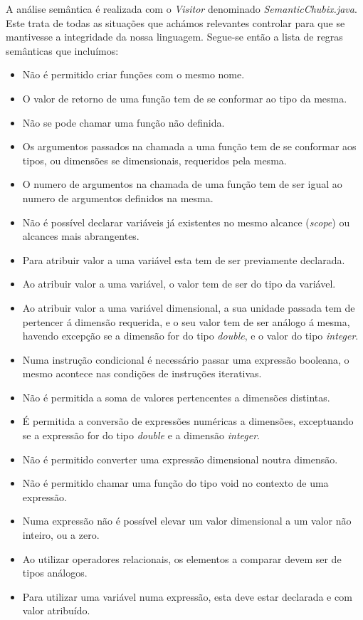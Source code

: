 \documentclass[10pt,portuguese]{article}
\begin{document}
\par A análise semântica é realizada com o \emph{Visitor} denominado \emph{SemanticChubix.java}. Este trata de todas as situações que achámos relevantes controlar para que se mantivesse a integridade da nossa linguagem. Segue-se então a lista de regras semânticas que incluímos:
\begin{itemize}
    \item Não é permitido criar funções com o mesmo nome.
    \item O valor de retorno de uma função tem de se conformar ao tipo da mesma.
    \item Não se pode chamar uma função não definida.
    \item Os argumentos passados na chamada a uma função tem de se conformar aos tipos, ou dimensões se dimensionais, requeridos pela mesma.
    \item O numero de argumentos na chamada de uma função tem de ser igual ao numero de argumentos definidos na mesma.
    \item Não é possível declarar variáveis já existentes no mesmo alcance (\emph{scope}) ou alcances mais abrangentes.
    \item Para atribuir valor a uma variável esta tem de ser previamente declarada.
    \item Ao atribuir valor a uma variável, o valor tem de ser do tipo da variável.
    \item Ao atribuir valor a uma variável dimensional, a sua unidade passada tem de pertencer á dimensão requerida, e o seu valor tem de ser análogo á mesma, havendo excepção se a dimensão for do tipo \emph{double}, e o valor do tipo \emph{integer}.
    \item Numa instrução condicional é necessário passar uma expressão booleana, o mesmo acontece nas condições de instruções iterativas.
    \item Não é permitida a soma de valores pertencentes a dimensões distintas.
    \item É permitida a conversão de expressões numéricas a dimensões, exceptuando se a expressão for do tipo \emph{double} e a dimensão \emph{integer}. 
    \item Não é permitido converter uma expressão dimensional noutra dimensão.
    \item Não é permitido chamar uma função do tipo void no contexto de uma expressão.
    \item Numa expressão não é possível elevar um valor dimensional a um valor não inteiro, ou a zero.
    \item Ao utilizar operadores relacionais, os elementos a comparar devem ser de tipos análogos.
    \item Para utilizar uma variável numa expressão, esta deve estar declarada e com valor atribuído.
\end{itemize}
\end{document}
